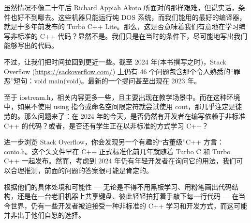 虽然情况不像二十年后 Richard Appiah Akoto 所面对的那样艰难，但说实话，条件也好不到哪去。这些机器只能运行纯 DOS 系统，而我们能用的最好的编译器，就是十多年前发布的 Turbo C++ Lite。那么，这是否意味着我们有意地在学习编写非标准的 C++ 代码？显然不是。我们只是在当时的条件下，尽可能地写出我们能够写出的代码。

不过，让我们把时间拉回到更近一些。截至 2024 年(本书撰写之时)，Stack Overflow (\url{https://sackoverflow.com/}) 上仍有 46 个问题包含那个令人熟悉的“罪恶”短句：void main(void)。最新的一个提问甚至出现在 2023 年。

至于 iostream.h，相关内容更多一些，且主要出现在教学场景中。而在这种环境中，如果不使用 using 指令或命名空间限定符就尝试使用 cout，那几乎注定是徒劳的。那么问题来了：在 2024 年的今天，是否仍然有开发者在编写依赖于非标准 C++ 的代码？或者，是否还有学生正在以非标准的方式学习 C++？

进一步浏览 Stack Overflow，你会发现另一个有趣的“古董级”C++ 方言：conio.h。这个头文件早在 C++ 正式标准化前几年就随着 Turbo C 和 Turbo C++ 一起发布。然而，考虑到 2024 年仍有年轻开发者在询问它的用法，我们可以合理推测，前面的问题的答案很可能是肯定的。

根据他们的具体处境和可能性 --- 无论是不得不用黑板学习、用粉笔画出代码结构，还是在一台老旧机器上共享键盘、彼此轻轻拍打着手敲下每一行代码 --- 在当今世界，仍有一些开发者被迫接受一种非标准的 C++ 学习和开发方式，而这可能并非出于他们自愿的选择。